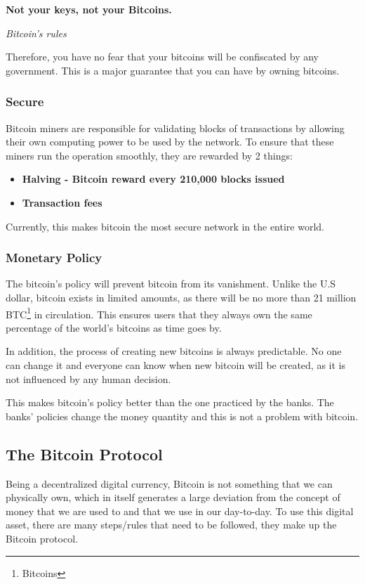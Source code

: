 \documentclass{article}
\newcommand\tab[1][1cm]{\hspace*{#1}}
\begin{document}
\renewcommand{\epigraphflush}{center}
\epigraph{\textbf{Not your keys, not your Bitcoins.}}{\textit{Bitcoin's rules}}

Therefore, you have no fear that your bitcoins will be confiscated by any government. This is a major guarantee that you can have by owning bitcoins.

\subsubsection{Secure}

\tab Bitcoin miners are responsible for validating blocks of transactions by allowing their own computing power to be used by the network. To ensure that these miners run the operation smoothly, they are rewarded by 2 things:

\begin{itemize}
    \item \textbf{Halving - Bitcoin reward every 210,000 blocks issued}
    \item \textbf{Transaction fees}
\end{itemize}

 Currently, this makes bitcoin the most secure network in the entire world. 
 
\subsubsection{Monetary Policy}

\tab The bitcoin's policy will prevent bitcoin from its vanishment. Unlike the U.S dollar, bitcoin exists in limited amounts, as there will be no more than 21 million BTC\footnote{Bitcoins} in circulation. This ensures users that they always own the same percentage of the world's bitcoins as time goes by.

In addition, the process of creating new bitcoins is always predictable. No one can change it and everyone can know when new bitcoin will be created, as it is not influenced by any human decision. 

This makes bitcoin's policy better than the one practiced by the banks. The banks' policies change the money quantity and this is not a problem with bitcoin.

\subsection{The Bitcoin Protocol}

\tab Being a decentralized digital currency, Bitcoin is not something that we can physically own, which in itself generates a large deviation from the concept of money that we are used to and that we use in our day-to-day. To use this digital asset, there are many steps/rules that need to be followed, they make up the Bitcoin protocol.
\end{document}
